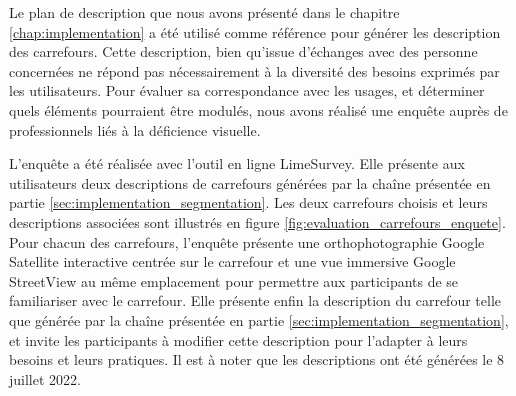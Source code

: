 Le plan de description que nous avons présenté dans le chapitre \ref{chap:implementation} a été utilisé comme référence pour générer les description des carrefours. Cette description, bien qu'issue d'échanges avec des personne concernées ne répond pas nécessairement à la diversité des besoins exprimés par les utilisateurs. Pour évaluer sa correspondance avec les usages, et déterminer quels éléments pourraient être modulés, nous avons réalisé une enquête auprès de professionnels liés à la déficience visuelle.

\newpar{}

L'enquête a été réalisée avec l'outil en ligne LimeSurvey. Elle présente aux utilisateurs deux descriptions de carrefours générées par la chaîne présentée en partie \ref{sec:implementation_segmentation}. Les deux carrefours choisis et leurs descriptions associées sont illustrés en figure \ref{fig:evaluation_carrefours_enquete}. Pour chacun des carrefours, l'enquête présente une orthophotographie Google Satellite interactive centrée sur le carrefour et une vue immersive Google StreetView au même emplacement pour permettre aux participants de se familiariser avec le carrefour. Elle présente enfin la description du carrefour telle que générée par la chaîne présentée en partie \ref{sec:implementation_segmentation}, et invite les participants à modifier cette description pour l'adapter à leurs besoins et leurs pratiques. Il est à noter que les descriptions ont été générées le 8 juillet 2022.

